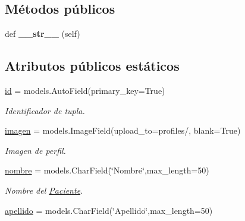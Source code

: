 \subsection*{Métodos públicos}
\begin{DoxyCompactItemize}
\item 
def {\bfseries \+\_\+\+\_\+str\+\_\+\+\_\+} (self)\hypertarget{classappEmotionIOT_1_1models_1_1Paciente_a9eecc0acbce835eedcd5e79a5d2d7749}{}\label{classappEmotionIOT_1_1models_1_1Paciente_a9eecc0acbce835eedcd5e79a5d2d7749}

\end{DoxyCompactItemize}
\subsection*{Atributos públicos estáticos}
\begin{DoxyCompactItemize}
\item 
\hyperlink{classappEmotionIOT_1_1models_1_1Paciente_a5796f999e8883a08868519ea38babdef}{id} = models.\+Auto\+Field(primary\+\_\+key=True)\hypertarget{classappEmotionIOT_1_1models_1_1Paciente_a5796f999e8883a08868519ea38babdef}{}\label{classappEmotionIOT_1_1models_1_1Paciente_a5796f999e8883a08868519ea38babdef}

\begin{DoxyCompactList}\small\item\em Identificador de tupla. \end{DoxyCompactList}\item 
\hyperlink{classappEmotionIOT_1_1models_1_1Paciente_af2581f26e5cc72b915a7d5acbb968625}{imagen} = models.\+Image\+Field(upload\+\_\+to=\textquotesingle{}profiles/\textquotesingle{}, blank=True)\hypertarget{classappEmotionIOT_1_1models_1_1Paciente_af2581f26e5cc72b915a7d5acbb968625}{}\label{classappEmotionIOT_1_1models_1_1Paciente_af2581f26e5cc72b915a7d5acbb968625}

\begin{DoxyCompactList}\small\item\em Imagen de perfil. \end{DoxyCompactList}\item 
\hyperlink{classappEmotionIOT_1_1models_1_1Paciente_aa44af170580c05214541c88998f8c8df}{nombre} = models.\+Char\+Field(\char`\"{}Nombre\char`\"{},max\+\_\+length=50)\hypertarget{classappEmotionIOT_1_1models_1_1Paciente_aa44af170580c05214541c88998f8c8df}{}\label{classappEmotionIOT_1_1models_1_1Paciente_aa44af170580c05214541c88998f8c8df}

\begin{DoxyCompactList}\small\item\em Nombre del \hyperlink{classappEmotionIOT_1_1models_1_1Paciente}{Paciente}. \end{DoxyCompactList}\item 
\hyperlink{classappEmotionIOT_1_1models_1_1Paciente_a08a940786cc1d13e14b661bb13e38cf6}{apellido} = models.\+Char\+Field(\char`\"{}Apellido\char`\"{},max\+\_\+length=50)\hypertarget{classappEmotionIOT_1_1models_1_1Paciente_a08a940786cc1d13e14b661bb13e38cf6}{}\label{classappEmotionIOT_1_1models_1_1Paciente_a08a940786cc1d13e14b661bb13e38cf6}


\end{DoxyCompactItemize}

